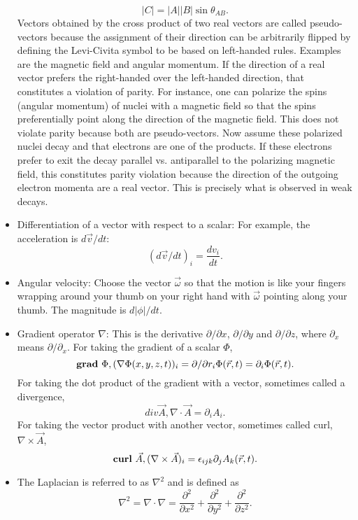 \begin{itemize}
\[
|C|=|A||B|\sin\theta_{AB}.
\]
Vectors obtained by the cross product of two real vectors are called pseudo-vectors because the assignment of their direction can be arbitrarily flipped by defining the Levi-Civita symbol to be based on left-handed rules. Examples are the magnetic field and angular momentum. If the direction of a real vector prefers the right-handed over the left-handed direction, that constitutes a violation of parity. For instance, one can polarize the spins (angular momentum) of nuclei with a magnetic field so that the spins preferentially point along the direction of the magnetic field. This does not violate parity because both are pseudo-vectors. Now assume these polarized nuclei decay and that electrons are one of the products. If these electrons prefer to exit the decay parallel vs. antiparallel to the polarizing magnetic field, this constitutes parity violation because the direction of the outgoing electron momenta are a real vector. This is precisely what is observed in weak decays.

\item Differentiation of a vector with respect to a scalar: For example, the acceleration is $d\vec{v}/dt$:
\[
(d\vec{v}/dt)_i=\frac{dv_i}{dt}.
\]

\item Angular velocity: Choose the vector $\vec{\omega}$ so that the motion is like your fingers wrapping around your thumb on your right hand with $\vec{\omega}$ pointing along your thumb. The magnitude is $d|\phi|/dt$.

\item Gradient operator $\nabla$: This is the derivative $\partial/\partial x$, $\partial/\partial y$ and $\partial/\partial z$, where $\partial _x$ means $\partial/\partial_x$. For taking the gradient of a scalar $\Phi$,
\[
{\rm\bf grad}~\Phi, (\nabla\Phi(x,y,z,t))_i=\partial/\partial r_i\Phi(\vec{r},t)=\partial_i\Phi(\vec{r},t).
\]
For taking the dot product of the gradient with a vector, sometimes called a divergence,
\[
div \vec{A}, \nabla\cdot\vec{A}=\partial_i A_i.
\]
For taking the vector product with another vector, sometimes called curl, $\nabla\times\vec{A}$,
\[
{\rm\bf curl}~\vec{A}, (\nabla\times\vec{A})_i=\epsilon_{ijk}\partial_j A_k(\vec{r},t).
\]
\item The Laplacian is referred to as $\nabla^2$ and is defined as
\[
\nabla^2=\nabla\cdot\nabla=\frac{\partial^2}{\partial x^2}+\frac{\partial^2}{\partial y^2}+\frac{\partial^2}{\partial z^2}.
\]
\end{itemize}

